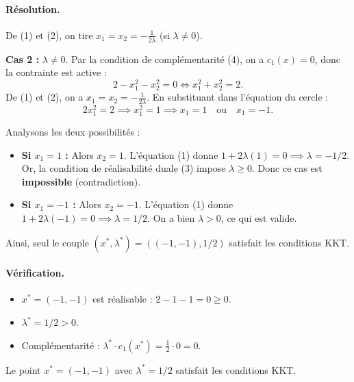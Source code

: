 \begin{exemple}
    \paragraph{Résolution.}
    De (1) et (2), on tire $x_1 = x_2 = -\frac{1}{2\lambda}$ (si $\lambda \neq 0$).
    
    \textbf{Cas 2 :} $\lambda \neq 0$.
    Par la condition de complémentarité (4), on a $c_1(x) = 0$, donc la contrainte est active :
    \begin{equation}
        2 - x_1^2 - x_2^2 = 0 \iff x_1^2 + x_2^2 = 2.
    \end{equation}
    De (1) et (2), on a $x_1 = x_2 = -\frac{1}{2\lambda}$.
    En substituant dans l'équation du cercle :
    \begin{equation}
        2 x_1^2 = 2 \implies x_1^2 = 1 \implies x_1 = 1 \quad \text{ou} \quad x_1 = -1.
    \end{equation}
    
    Analysons les deux possibilités :
    \begin{itemize}
        \item \textbf{Si $x_1 = 1$ :} Alors $x_2 = 1$. L'équation (1) donne $1 + 2\lambda(1) = 0 \implies \lambda = -1/2$.
        Or, la condition de réalisabilité duale (3) impose $\lambda \geq 0$.
        Donc ce cas est \textbf{impossible} (contradiction).
        
        \item \textbf{Si $x_1 = -1$ :} Alors $x_2 = -1$. L'équation (1) donne $1 + 2\lambda(-1) = 0 \implies \lambda = 1/2$.
        On a bien $\lambda > 0$, ce qui est valide.
    \end{itemize}
    
    Ainsi, seul le couple $(x^*, \lambda^*) = ((-1, -1), 1/2)$ satisfait les conditions KKT.
    
    \paragraph{Vérification.}
    \begin{itemize}
        \item $x^* = (-1, -1)$ est réalisable : $2 - 1 - 1 = 0 \geq 0$. \checkmark
        \item $\lambda^* = 1/2 > 0$. \checkmark
        \item Complémentarité : $\lambda^* \cdot c_1(x^*) = \frac{1}{2} \cdot 0 = 0$. \checkmark
    \end{itemize}
    
    Le point $x^* = (-1, -1)$ avec $\lambda^* = 1/2$ satisfait les conditions KKT.
    

\end{exemple}
